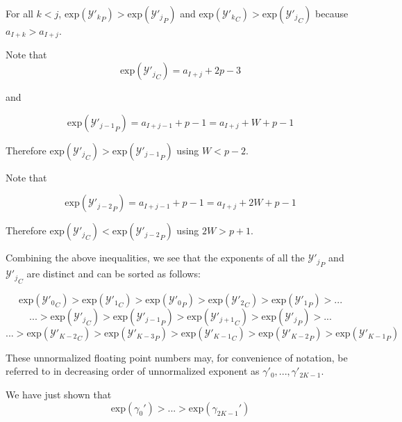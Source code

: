 \documentclass[12pt]{article}
\providecommand{\exp}{\ensuremath{\text{exp}}}
\theoremstyle{definition}
\numberwithin{equation}{section}
\numberwithin{figure}{section}
\begin{document}
    For all $k < j$, $\exp({\mathcal{Y}'_k}_P) > \exp({\mathcal{Y}'_j}_P)$ and $\exp({\mathcal{Y}'_k}_C) > \exp({\mathcal{Y}'_j}_C)$ because $a_{I + k} > a_{I + j}$.

    Note that
    \begin{equation*}
      \exp({\mathcal{Y}'_j}_C) = a_{I + j} + 2  p - 3
    \end{equation*}

    and

    \begin{equation*}
      \exp({\mathcal{Y}'_{j - 1}}_P) = a_{I + j - 1} + p - 1 = a_{I + j} + W + p - 1
    \end{equation*}

    Therefore $\exp({\mathcal{Y}'_j}_C) > \exp({\mathcal{Y}'_{j - 1}}_P)$ using $W < p - 2$.

    Note that

    \begin{equation*}
      \exp({\mathcal{Y}'_{j - 2}}_P) = a_{I + j - 1} + p - 1 = a_{I + j} + 2 W + p - 1
    \end{equation*}

    Therefore $\exp({\mathcal{Y}'_j}_C) < \exp({\mathcal{Y}'_{j - 2}}_P)$ using $2  W > p + 1$.

    Combining the above inequalities, we see that the exponents of all the ${\mathcal{Y}'_j}_P$ and ${\mathcal{Y}'_j}_C$ are distinct and can be sorted as follows:

    \begin{equation*}
    \exp({\mathcal{Y}'_0}_C) > \exp({\mathcal{Y}'_1}_C) > \exp({\mathcal{Y}'_0}_P) > \exp({\mathcal{Y}'_2}_C) > \exp({\mathcal{Y}'_1}_P) > ...
    \end{equation*}
    \begin{equation*}
    ...> \exp({\mathcal{Y}'_j}_C) > \exp({\mathcal{Y}'_{j - 1}}_P) > \exp({\mathcal{Y}'_{j + 1}}_C) > \exp({\mathcal{Y}'_j}_P) > ...
    \end{equation*}
    \begin{equation*}
    ...> \exp({\mathcal{Y}'_{K - 2}}_C) > \exp({\mathcal{Y}'_{K - 3}}_P) > \exp({\mathcal{Y}'_{K - 1}}_C) > \exp({\mathcal{Y}'_{K - 2}}_P) > \exp({\mathcal{Y}'_{K - 1}}_P)
    \end{equation*}

    These unnormalized floating point numbers may, for convenience of notation, be referred to in decreasing order of unnormalized exponent as $\gamma'_0, ..., \gamma'_{2  K - 1}$.

    We have just shown that
    \begin{equation}
      \exp(\gamma_0') > ... > \exp(\gamma_{2  K - 1}')
      \label{eq:gammadecreases}
    \end{equation}
\end{document}
